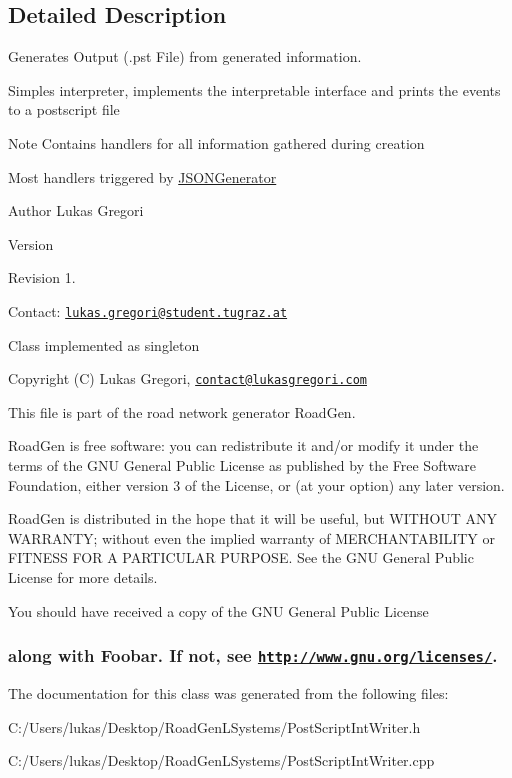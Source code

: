 \subsection{Detailed Description}
Generates Output (.pst File) from generated information. 

Simples interpreter, implements the interpretable interface and prints the events to a postscript file

\begin{DoxyNote}{Note}
Contains handlers for all information gathered during creation 

Most handlers triggered by \hyperlink{class_j_s_o_n_generator}{J\+S\+O\+N\+Generator}
\end{DoxyNote}
\begin{DoxyAuthor}{Author}
Lukas Gregori 
\end{DoxyAuthor}
\begin{DoxyVersion}{Version}

\end{DoxyVersion}
\begin{DoxyParagraph}{Revision}
1. 
\end{DoxyParagraph}


Contact\+: \href{mailto:lukas.gregori@student.tugraz.at}{\tt lukas.\+gregori@student.\+tugraz.\+at}

Class implemented as singleton



 Copyright (C) Lukas Gregori, \href{mailto:contact@lukasgregori.com}{\tt contact@lukasgregori.\+com}

This file is part of the road network generator Road\+Gen.

Road\+Gen is free software\+: you can redistribute it and/or modify it under the terms of the G\+NU General Public License as published by the Free Software Foundation, either version 3 of the License, or (at your option) any later version.

Road\+Gen is distributed in the hope that it will be useful, but W\+I\+T\+H\+O\+UT A\+NY W\+A\+R\+R\+A\+N\+TY; without even the implied warranty of M\+E\+R\+C\+H\+A\+N\+T\+A\+B\+I\+L\+I\+TY or F\+I\+T\+N\+E\+SS F\+OR A P\+A\+R\+T\+I\+C\+U\+L\+AR P\+U\+R\+P\+O\+SE. See the G\+NU General Public License for more details.

You should have received a copy of the G\+NU General Public License \subsubsection*{along with Foobar. If not, see \href{http://www.gnu.org/licenses/}{\tt http\+://www.\+gnu.\+org/licenses/}. }

The documentation for this class was generated from the following files\+:\begin{DoxyCompactItemize}
\item 
C\+:/\+Users/lukas/\+Desktop/\+Road\+Gen\+L\+Systems/Post\+Script\+Int\+Writer.\+h\item 
C\+:/\+Users/lukas/\+Desktop/\+Road\+Gen\+L\+Systems/Post\+Script\+Int\+Writer.\+cpp\end{DoxyCompactItemize}

